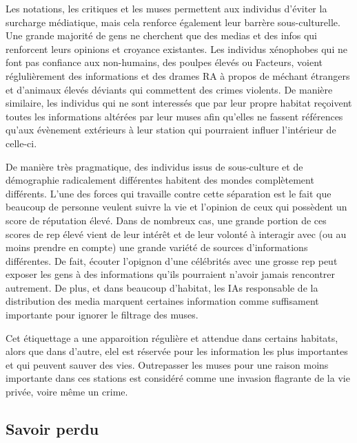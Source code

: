                Les notations, les critiques et les muses permettent aux individus d'éviter la surcharge médiatique, mais cela renforce également leur barrère sous-culturelle. Une grande majorité de gens ne cherchent que des medias et des infos qui renforcent leurs opinions et croyance existantes. Les individus xénophobes qui ne font pas confiance aux non-humains, des poulpes élevés ou Facteurs, voient réglulièrement des informations et des drames RA à propos de méchant étrangers et d'animaux élevés déviants qui commettent des crimes violents. De manière similaire, les individus qui ne sont interessés que par leur propre habitat reçoivent toutes les informations altérées par leur muses afin qu'elles ne fassent références qu'aux évènement extérieurs à leur station qui pourraient influer l'intérieur de celle-ci. 

               De manière très pragmatique, des individus issus de sous-culture et de démographie radicalement différentes habitent des mondes complètement différents. L'une des forces qui travaille contre cette séparation est le fait que beaucoup de personne veulent suivre la vie et l'opinion de ceux qui possèdent un score de réputation élevé. Dans de nombreux cas, une grande portion de ces scores de rep élevé vient de leur intérêt et de leur volonté à interagir avec (ou au moins prendre en compte) une grande variété de sources d'informations différentes. De fait, écouter l'opignon d'une célébrités avec une grosse rep peut exposer les gens à des informations qu'ils pourraient n'avoir jamais rencontrer autrement. De plus, et dans beaucoup d'habitat, les IAs responsable de la distribution des media marquent certaines information comme suffisament importante pour ignorer le filtrage des muses. 

               Cet étiquettage a une apparoition régulière et attendue dans certains habitats, alors que dans d'autre, elel est réservée pour les information les plus importantes et qui peuvent sauver des vies. Outrepasser les muses pour une raison moins importante dans ces stations est considéré comme une invasion flagrante de la vie privée, voire même un crime. 

               \subsection{Savoir perdu} \label{sec:lost-lore} 

